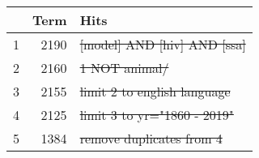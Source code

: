 \searchsize
\begin{tabular}{rrl}
	\toprule
	  &       Term & Hits                             \\
	\midrule
	1 & \num{2190} & \st{[model] AND [hiv] AND [ssa]} \\
	2 & \num{2160} & \st{1 NOT animal/}               \\
	3 & \num{2155} & \st{limit 2 to english language} \\
	4 & \num{2125} & \st{limit 3 to yr="1860 - 2019"} \\
	5 & \num{1384} & \st{remove duplicates from 4}    \\
	\bottomrule
\end{tabular}